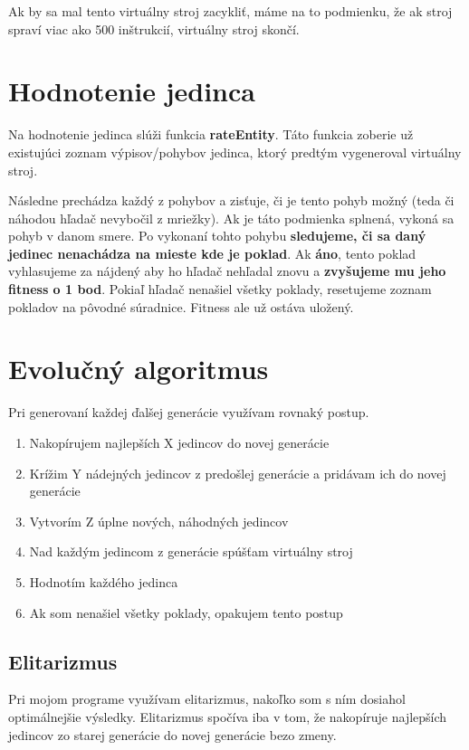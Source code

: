 \documentclass[10pt,oneside,slovak,a4paper]{article}
\begin{document}
Ak by sa mal tento virtuálny stroj zacykliť, máme na to podmienku, že ak stroj spraví viac ako 500 inštrukcií, virtuálny stroj skončí.

\section{Hodnotenie jedinca}

Na hodnotenie jedinca slúži funkcia \textbf{rateEntity}. Táto funkcia zoberie už existujúci zoznam výpisov/pohybov jedinca, ktorý predtým vygeneroval virtuálny stroj.

Následne prechádza každý z pohybov a zisťuje, či je tento pohyb možný (teda či náhodou hľadač nevybočil z mriežky).
Ak je táto podmienka splnená, vykoná sa pohyb v danom smere.
Po vykonaní tohto pohybu \textbf{sledujeme, či sa daný jedinec nenachádza na mieste kde je poklad}. Ak \textbf{áno}, tento poklad vyhlasujeme za nájdený aby ho hľadač nehľadal znovu a \textbf{zvyšujeme mu jeho fitness o 1 bod}. Pokiaľ hľadač nenašiel všetky poklady, resetujeme zoznam pokladov na pôvodné súradnice. Fitness ale už ostáva uložený.

\section{Evolučný algoritmus}

Pri generovaní každej ďalšej generácie využívam rovnaký postup.

\begin{enumerate}
\item{Nakopírujem najlepších X jedincov do novej generácie}
\item{Krížim Y nádejných jedincov z predošlej generácie a pridávam ich do novej generácie}
\item{Vytvorím Z úplne nových, náhodných jedincov}
\item{Nad každým jedincom z generácie spúšťam virtuálny stroj}
\item{Hodnotím každého jedinca}
\item{Ak som nenašiel všetky poklady, opakujem tento postup}
\end{enumerate}

\subsection{Elitarizmus}

Pri mojom programe využívam elitarizmus, nakoľko som s ním dosiahol optimálnejšie výsledky.
Elitarizmus spočíva iba v tom, že nakopíruje najlepších jedincov zo starej generácie do novej generácie bezo zmeny.
\end{document}
